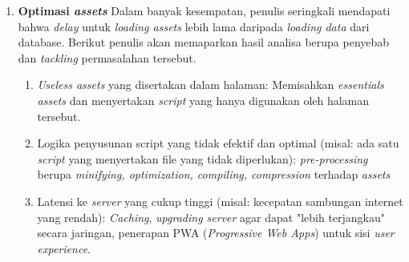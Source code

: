 \begin{enumerate}
		\item \textbf{Optimasi \textit{assets}} \newline
		\indent Dalam banyak kesempatan, penulis seringkali mendapati bahwa \textit{delay} untuk \textit{loading assets} lebih lama daripada \textit{loading data} dari database. Berikut penulis akan memaparkan hasil analisa berupa penyebab dan \textit{tackling} permasalahan tersebut.
			\begin{enumerate}
				\item \textit{Useless assets} yang disertakan dalam halaman: Memisahkan \textit{essentials assets} dan menyertakan \textit{script} yang hanya digunakan oleh halaman tersebut.
				\item Logika penyusunan script yang tidak efektif dan optimal (misal: ada satu \textit{script} yang menyertakan file yang tidak diperlukan): \textit{pre-processing} berupa \textit{minifying, optimization, compiling, compression} terhadap \textit{assets}
				\item Latensi ke \textit{server} yang cukup tinggi (misal: kecepatan sambungan internet yang rendah): \textit{Caching}, \textit{upgrading server} agar dapat "lebih terjangkau" secara jaringan, penerapan PWA (\textit{Progressive Web Apps}) untuk sisi \textit{user experience}.
			\end{enumerate}
	\end{enumerate}